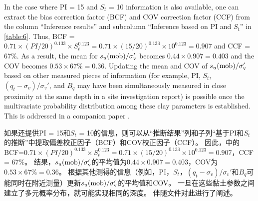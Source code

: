 \begin{paracol}{2}
    In the case where PI = 15 and $S_t$ = 10 information is also available, one can extract the bias correction factor (BCF) and COV correction factor (CCF) from the column “Inference results” and subcolumn “Inference based on PI and $S_t$” in \autoref{table:6}. Thus, BCF = $0.71\times{}(PI/20)^{0.133}\times{}S_t^{0.123} = 0.71\times{}(15/20)^{0.133}\times{}10^{0.123} = 0.907$ and CCF = 67$\%$. As a result, the mean for $s_u(\rm{mob})/\sigma_v'$ becomes $0.44\times{}0.907 = 0.403$ and the COV becomes $0.53\times{}67\%= 0.36$. Updating the mean and COV of $s_u(\rm{mob})/\sigma_v'$ based on other measured pieces of information (for example, PI, $S_t$, $(q_t-\sigma_v)/\sigma_v'$, and $B_q$ may have been simultaneously measured in close proximity at the same depth in a site investigation report) is possible once the multivariate probability distribution among these clay parameters is established. This is addressed in a companion paper \citep{Ching2014686}.
        
    \switchcolumn
    
    如果还提供PI = 15和$S_t$ = 10的信息，则可以从“推断结果”列和子列“基于PI和$S_t$的推断”中提取偏差校正因子（BCF）和COV校正因子（CCF）。 因此，中的BCF=$0.71\times{}(PI/20)^{0.133}\times{}S_t^{0.123} = 0.71\times{}(15/20)^{0.133}\times{}10^{0.123} = 0.907$，CCF = 67$\%$。 结果，$s_u(\rm{mob})/\sigma_v'$的平均值为$0.44\times{}0.907 = 0.403$，COV为$0.53\times{}67\%= 0.36$。 根据其他测得的信息（例如，PI，$S_t$，$(q_t-\sigma_v)/\sigma_v'$和$B_q$可能同时在附近测量）更新$s_u(\rm{mob})/\sigma_v'$的平均值和COV。 一旦在这些黏土参数之间建立了多元概率分布，就可能实现相同的深度。 伴随文件对此进行了阐述\citep{Ching2014686}。
        
\end{paracol}